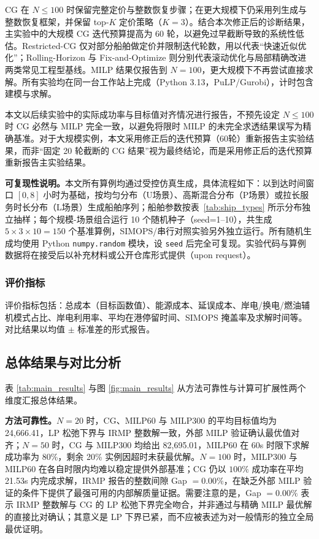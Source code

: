 \documentclass[UTF8, a4paper, 12pt]{ctexart}
\theoremstyle{plain}
\theoremstyle{definition}
\theoremstyle{remark}
\begin{document}
CG 在 $N\le 100$ 时保留完整定价与整数恢复步骤；在更大规模下仍采用列生成与整数恢复框架，并保留 top-$K$ 定价策略（$K=3$）。结合本次修正后的诊断结果，主实验中的大规模 CG 迭代预算提高为 60 轮，以避免过早截断导致的系统性低估。Restricted-CG 仅对部分船舶做定价并限制迭代轮数，用以代表“快速近似优化”；Rolling-Horizon 与 Fix-and-Optimize 则分别代表滚动优化与局部精确改进两类常见工程型基线。MILP 结果仅报告到 $N=100$，更大规模下不再尝试直接求解。所有实验均在同一台工作站上完成（Python 3.13，PuLP/Gurobi），计时包含建模与求解。

本文以后续实验中的实际成功率与目标值对齐情况进行报告，不预先设定 $N\le 100$ 时 CG 必然与 MILP 完全一致，以避免将限时 MILP 的未完全求透结果误写为精确基准。对于大规模实例，本文采用修正后的迭代预算（60轮）重新报告主实验结果，而非“固定 20 轮截断的 CG 结果”视为最终结论，而是采用修正后的迭代预算重新报告主实验结果。

\textbf{可复现性说明。}本文所有算例均通过受控仿真生成，具体流程如下：以到达时间窗口 $[0,8]$ 小时为基础，按均匀分布（U场景）、高斯混合分布（P场景）或拉长服务时长分布（L场景）生成船舶序列；船舶参数按表~\ref{tab:ship_types} 所示分布独立抽样；每个规模-场景组合运行 10 个随机种子（seed=1--10），共生成 $5 \times 3 \times 10 = 150$ 个基准算例，SIMOPS/串行对照实验另外独立运行。所有随机生成均使用 Python \texttt{numpy.random} 模块，设 \texttt{seed} 后完全可复现。实验代码与算例数据将在接受后以补充材料或公开仓库形式提供（upon request）。

\subsubsection{评价指标}
\label{sec:metrics}
评价指标包括：总成本（目标函数值）、能源成本、延误成本、岸电/换电/燃油辅机模式占比、岸电利用率、平均在港停留时间、SIMOPS 掩盖率及求解时间等。对比结果以均值 $\pm$ 标准差的形式报告。

\subsection{总体结果与对比分析}
\label{sec:overall_results}
表 \ref{tab:main_results} 与图 \ref{fig:main_results} 从方法可靠性与计算可扩展性两个维度汇报总体结果。

\textbf{方法可靠性。}$N=20$ 时，CG、MILP60 与 MILP300 的平均目标值均为 24{,}666.41，LP 松弛下界与 IRMP 整数解一致，外部 MILP 验证确认最优值对齐；$N=50$ 时，CG 与 MILP300 均给出 82{,}695.01，MILP60 在 60s 时限下求解成功率为 80\%，剩余 20\% 实例因超时未获最优解。$N=100$ 时，MILP300 与 MILP60 在各自时限内均难以稳定提供外部基准；CG 仍以 $100\%$ 成功率在平均 21.53s 内完成求解，IRMP 报告的整数间隙 Gap $= 0.00\%$，在缺乏外部 MILP 验证的条件下提供了最强可用的内部解质量证据。需要注意的是，Gap $= 0.00\%$ 表示 IRMP 整数解与 CG 的 LP 松弛下界完全吻合，并非通过与精确 MILP 最优解的直接比对确认；其意义是 LP 下界已紧，而不应被表述为对一般情形的独立全局最优证明。
\end{document}
